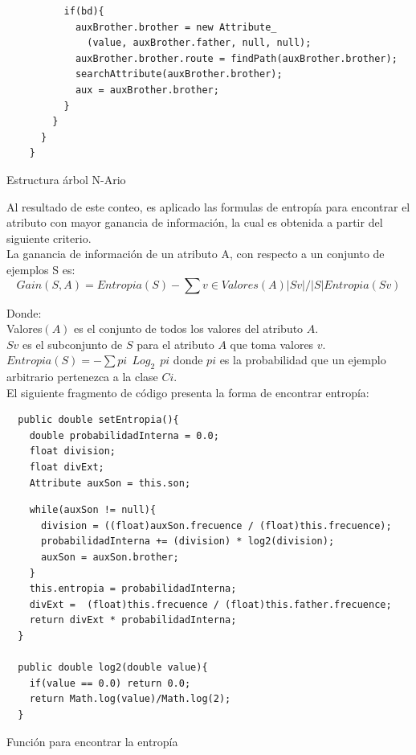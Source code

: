 \newpage
\begin{codigof}[!h]
\begin{verbatim}
          if(bd){  
            auxBrother.brother = new Attribute_
              (value, auxBrother.father, null, null);
            auxBrother.brother.route = findPath(auxBrother.brother);
            searchAttribute(auxBrother.brother);
            aux = auxBrother.brother;
          }
        }
      } 
    }
\end{verbatim}
\caption{Estructura \'arbol N-Ario}
\label{codc451}
\end{codigof}

Al resultado de este conteo, es aplicado las formulas de entrop\'ia para encontrar el atributo con mayor ganancia
de informaci\'on, la cual es obtenida a partir del siguiente criterio.\\

La ganancia de informaci\'on de un atributo A, con respecto a un conjunto de ejemplos S es:\\
\begin{displaymath}
Gain(S,A)=Entropia(S)-\sum v\in Valores(A) |Sv|/|S|Entropia(Sv)
\end{displaymath}

Donde:\\

Valores$(A)$ es el conjunto de todos los valores del atributo $A$.\\
$Sv$ es el subconjunto de $S$ para el atributo $A$ que toma valores $v$.\\
$Entropia(S)=-\sum pi\ \ Log_{2}\ \ pi$ donde $pi$ es la probabilidad que un ejemplo arbitrario pertenezca a la
clase $Ci$.\\

El siguiente fragmento de c\'odigo presenta la forma de encontrar entrop\'ia:\\

\begin{codigof}[!h]
\begin{verbatim}
  public double setEntropia(){
    double probabilidadInterna = 0.0;
    float division;
    float divExt;
    Attribute auxSon = this.son;

\end{verbatim}
\end{codigof}

\newpage
\begin{codigof}[!h]
\begin{verbatim}
    while(auxSon != null){
      division = ((float)auxSon.frecuence / (float)this.frecuence);
      probabilidadInterna += (division) * log2(division);
      auxSon = auxSon.brother;
    }
    this.entropia = probabilidadInterna;
    divExt =  (float)this.frecuence / (float)this.father.frecuence;
    return divExt * probabilidadInterna;
  }

  public double log2(double value){ 
    if(value == 0.0) return 0.0;
    return Math.log(value)/Math.log(2);
  }

\end{verbatim}
\caption{Funci\'on para encontrar la entrop\'ia}
\label{codc452}
\end{codigof}

